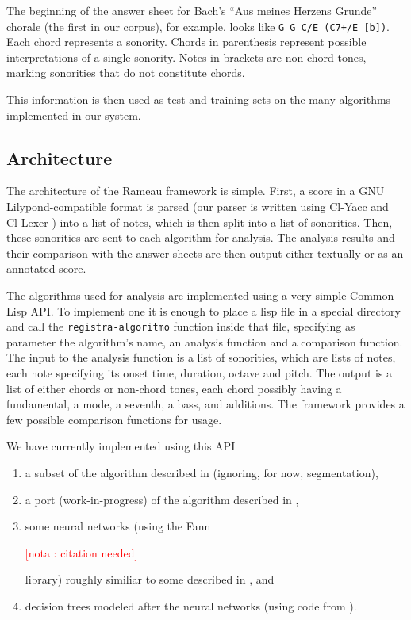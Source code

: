 \documentclass{article}
\newcounter{notacounter}
\newcommand{\nota}[1]{
  \addtocounter{notacounter}{1}
  \textcolor{red}{[nota \arabic{notacounter}: #1]}
}
\begin{document}
The beginning of the answer sheet for Bach's ``Aus meines Herzens
Grunde'' chorale (the first in our corpus), for example, looks like
\texttt{G G C/E (C7+/E [b])}. Each chord represents a sonority. Chords
in parenthesis represent possible interpretations of a single
sonority. Notes in brackets are non-chord tones, marking sonorities
that do not constitute chords.

This information is then used as test and training sets on the many
algorithms implemented in our system.

\subsection{Architecture}
\label{sec:architecture-and-api}

The architecture of the Rameau framework is simple. First, a score in
a GNU Lilypond-compatible format is parsed (our parser is written
using Cl-Yacc \cite{chroboczek:_cl_yacc_manual} and Cl-Lexer
\cite{parker:_lexer_packag}) into a list of notes, which is then split
into a list of sonorities. Then, these sonorities are sent to each
algorithm for analysis. The analysis results and their comparison with
the answer sheets are then output either textually or as an annotated
score.

The algorithms used for analysis are implemented using a very simple
Common Lisp API. To implement one it is enough to place a lisp file in
a special directory and call the \texttt{registra-algoritmo} function
inside that file, specifying as parameter the algorithm's name, an
analysis function and a comparison function. The input to the analysis
function is a list of sonorities, which are lists of notes, each note
specifying its onset time, duration, octave and pitch. The output is a
list of either chords or non-chord tones, each chord possibly having a
fundamental, a mode, a seventh, a bass, and additions. The framework
provides a few possible comparison functions for usage.

We have currently implemented using this API 
\begin{enumerate}
\item a subset of the algorithm described in \cite{pardo02:algorithms}
  (ignoring, for now, segmentation), 
\item a port (work-in-progress) of the algorithm described in
  \cite{temperley99:modeling}, 
\item some neural networks (using the Fann \nota{citation needed}
  library) roughly similiar to some described in
  \cite{tsui02:_harmon_analy_using_neural_networ}, and
\item decision trees modeled after the neural networks (using code
  from \cite{Mitchell:1997:ML}).
\end{enumerate}
\end{document}
